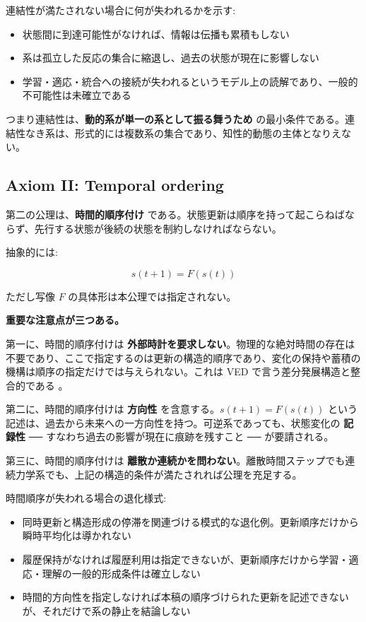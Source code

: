 連結性が満たされない場合に何が失われるかを示す:

\begin{itemize}
\item 状態間に到達可能性がなければ、情報は伝播も累積もしない
\item 系は孤立した反応の集合に縮退し、過去の状態が現在に影響しない
\item 学習・適応・統合への接続が失われるというモデル上の読解であり、一般的不可能性は未確立である
\end{itemize}

つまり連結性は、\textbf{動的系が単一の系として振る舞うため} の最小条件である。連結性なき系は、形式的には複数系の集合であり、知性的動態の主体となりえない。

\subsection{Axiom II: Temporal ordering}


第二の公理は、\textbf{時間的順序付け} である。状態更新は順序を持って起こらねばならず、先行する状態が後続の状態を制約しなければならない。

抽象的には:

\[
s(t+1) = F(s(t))
\]

ただし写像 $F$ の具体形は本公理では指定されない。

\textbf{重要な注意点が三つある。}

第一に、時間的順序付けは \textbf{外部時計を要求しない}。物理的な絶対時間の存在は不要であり、ここで指定するのは更新の構造的順序であり、変化の保持や蓄積の機構は順序の指定だけでは与えられない。これは VED で言う差分発展構造と整合的である \citep{VEDVol1}。

第二に、時間的順序付けは \textbf{方向性} を含意する。$s(t+1) = F(s(t))$ という記述は、過去から未来への一方向性を持つ。可逆系であっても、状態変化の \textbf{記録性} ── すなわち過去の影響が現在に痕跡を残すこと ── が要請される。

第三に、時間的順序付けは \textbf{離散か連続かを問わない}。離散時間ステップでも連続力学系でも、上記の構造的条件が満たされれば公理を充足する。

時間順序が失われる場合の退化様式:

\begin{itemize}
\item 同時更新と構造形成の停滞を関連づける模式的な退化例。更新順序だけから瞬時平均化は導かれない
\item 履歴保持がなければ履歴利用は指定できないが、更新順序だけから学習・適応・理解の一般的形成条件は確立しない
\item 時間的方向性を指定しなければ本稿の順序づけられた更新を記述できないが、それだけで系の静止を結論しない
\end{itemize}

